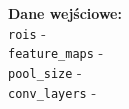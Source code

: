 \vspace{0.3cm}
\textbf{Dane wejściowe:} \\
\hspace*{\algorithmicindent} \verb|rois| - \roisdescription \\
\hspace*{\algorithmicindent} \verb|feature_maps| - \featuremapdescription \\
\hspace*{\algorithmicindent} \verb|pool_size| - \poolsizedescription \\
\hspace*{\algorithmicindent} \verb|conv_layers| - \convlayersdescription \\
